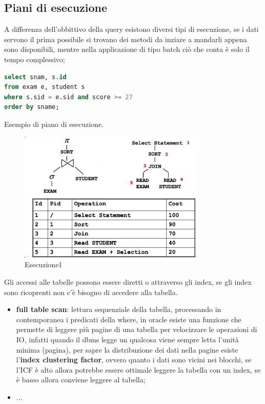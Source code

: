 \documentclass[12pt]{article}
\begin{document}
\subsection{Piani di esecuzione}
A differenza dell'obbittivo della query esistono diversi tipi di esecuzione, se i dati servono il prima possibile si trovano dei metodi da inziare a mandarli appena sono disponibili, mentre nella applicazione di tipo batch ci\`o che conta \`e solo il tempo complessivo;
\begin{lstlisting}[language=sql]
select snam, s.id
from exam e, student s
where s.sid = e.sid and score >= 27
order by sname;
\end{lstlisting}
Esempio di piano di esecuzione.
\begin{figure}[H]
    \centering
    \includegraphics[width=0.8\textwidth]{esecuzione1.png}
    \caption{Esecuzione1}
    \label{fig:esecuzione1}
\end{figure}
Gli accessi alle tabelle possono essere diretti o attraverso gli index, se gli index sono ricoprenti non c'\`e bisogno di accedere alla tabella.
\begin{itemize}
    \item \textbf{full table scan}: lettura sequenziale della tabella, processando in contemporanea i predicati della where, in oracle esiste una funzione che permette di leggere pi\`u pagine di una tabella per velocizzare le operazioni di IO, infatti quando il dbms legge un qualcosa viene sempre letta l'unit\`a minima (pagina), per sapre la distribuzione dei dati nella pagine esiste l'\textbf{index clustering factor}, ovvero quanto i dati sono vicini nei blocchi, se l'ICF \`e alto allora potrebbe essere ottimale leggere la tabella con un index, se \`e basso allora conviene leggere al tabella;
    \item ...
\end{itemize}
\end{document}
